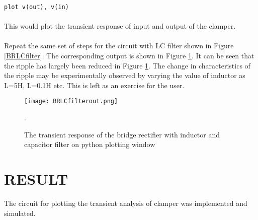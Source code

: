 \texttt{plot v(out), v(in) }

\paragraph{}

This would plot the transient response of input and output of the clamper. 

\paragraph{}Repeat the same set of steps for the circuit with LC filter shown in Figure \ref{BRLCfilter}. The corresponding output is shown in Figure \ref{BRLCfilterout}.  It can be seen that the ripple has largely been reduced in Figure \ref{BRLCfilterout}. The change in characteristics of the ripple may be experimentally observed by varying the value of inductor as L=5H, L=0.1H etc. This is left as an exercise for the user.

\begin{figure}[h]
\centering
\texttt{[image: BRLCfilterout.png]}
\caption{The transient response of the bridge rectifier with inductor and capacitor filter on python plotting window}
\label{BRLCfilterout}.
\end{figure}

\section*{RESULT}
The circuit for plotting the transient analysis of clamper was implemented and simulated.


